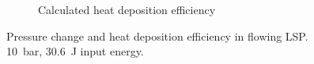 \begin{figure}[h]
\begin{subfigure}[t]{0.47\textwidth}
                \caption{Calculated heat deposition efficiency}
                \label{fig:flow_pressure_efficiency}
            \end{subfigure}
            \caption[Pressure change and heat deposition efficiency in flowing LSP]{Pressure change and heat deposition efficiency in flowing LSP. \qty{10}{bar}, \qty{30.6}{J} input energy.}
            \label{fig:flow_pressure}
        \end{figure}